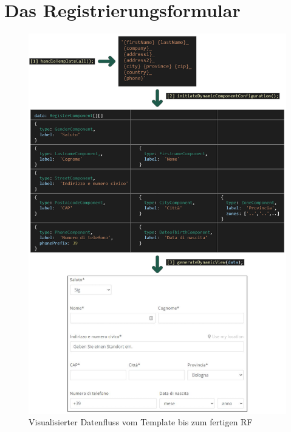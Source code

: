 \chapter{Das Registrierungsformular}





\begin{figure}[H]
	\centerline{
		\includegraphics[width=1\textwidth, frame]{./grafiken/RF_Datenvisualisierung.png}
	}
	\vskip0pt
	\caption{Visualisierter Datenfluss vom Template bis zum fertigen RF}
\end{figure}

